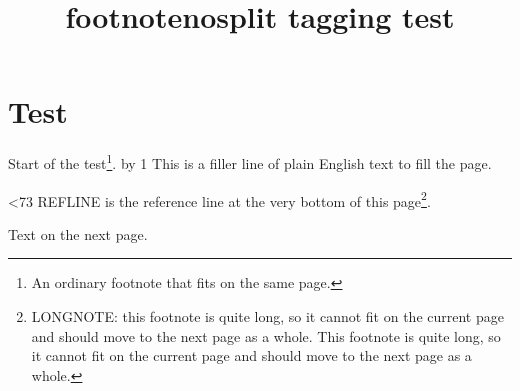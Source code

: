 \documentclass{book}
\title{footnotenosplit tagging test}
\def\FILLN{73}
\begin{document}
\chapter{Test}
Start of the test\footnote{An ordinary footnote that fits on the same page.}.
\newcount\mycount {}
\loop
  \advance\mycount by 1
  This is a filler line of plain English text to fill the page.\par
\ifnum\mycount<\FILLN \repeat
REFLINE is the reference line at the very bottom of this page\footnote{LONGNOTE: this footnote is quite long, so it cannot fit on the current page and should move to the next page as a whole. This footnote is quite long, so it cannot fit on the current page and should move to the next page as a whole.}.

Text on the next page.
\end{document}
